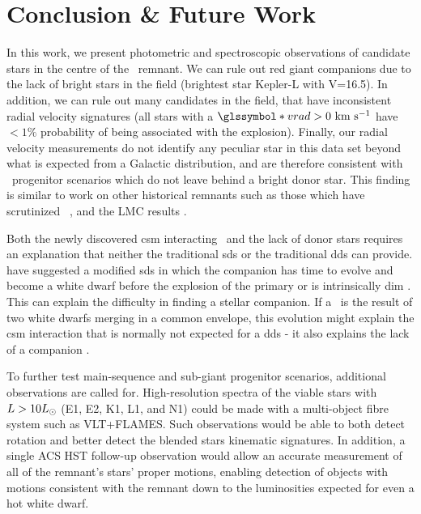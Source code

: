 \documentclass[preprint2]{aastex}
\begin{document}



\section{Conclusion \& Future Work}

\label{sec:conclusion}

In this work, we present photometric and spectroscopic observations of candidate stars in the centre of the \ remnant. We can rule out red giant companions due to the lack of bright stars in the field (brightest star Kepler-L with V=16.5). In addition, we can rule out many candidates in the field, that have inconsistent radial velocity signatures (all stars with a $\vrad>0~\kms$ have $< 1\%$ probability of being associated with the explosion). Finally, our radial velocity measurements do not identify any peculiar star in this data set beyond what is expected from a Galactic distribution, and are therefore consistent with \snia\ progenitor scenarios which do not leave behind a bright donor star. This finding is similar to work on other historical remnants such as those which have scrutinized \ \citep{2012Natur.489..533G,2012ApJ...759....7K}, and the LMC results \citep{2012ApJ...747L..19E, 2012Natur.481..164S}. 

Both the newly discovered \gls{csm} interacting \sneia\ and the lack of donor stars requires an explanation that neither the traditional \gls{sds} or the traditional \gls{dds} can provide. \citet{2011ApJ...730L..34J,2011ApJ...738L...1D,2012ApJ...744...69H,2012ApJ...756L...4H} have suggested a modified \gls{sds} in which the companion has time to evolve and become a white dwarf before the explosion of the primary or is intrinsically dim \citep{2012ApJ...758..123W}. This can explain the difficulty in finding a stellar companion. If a \snia\ is the result of two white dwarfs merging in a common envelope, this evolution might explain the \gls{csm} interaction that is normally not expected for a \gls{dds} - it also explains the lack of a companion \citep[][van Kerkwijk priv. comm. ]{2011MNRAS.417.1466K}.  

To further test main-sequence and sub-giant progenitor scenarios, additional observations are called for. High-resolution spectra of the viable stars with $L>10\hbox{$L_{\odot}$}$ (E1, E2, K1, L1, and N1) could be made with a multi-object fibre system such as VLT+FLAMES. Such observations would be able to both detect rotation and better detect the blended stars kinematic signatures. In addition, a single ACS HST follow-up observation would allow an accurate measurement of all of the remnant's stars' proper motions, enabling detection of objects with motions consistent with the remnant down to the luminosities expected for even a hot white dwarf. 
\end{document}
